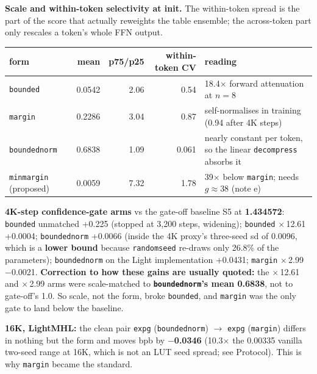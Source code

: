 \documentclass[10pt]{article}
\newcommand{\code}[1]{{\renewcommand{\_}{\textunderscore\allowbreak}\texttt{#1}}}
\begin{document}
\textbf{Scale and within-token selectivity at init.} The within-token spread is the part of the score that actually reweights the table ensemble;
the across-token part only rescales a token's whole FFN output.
\begin{center}\small
\begin{tabular}{lrrrl}
\toprule
form & mean & p75/p25 & within-token CV & reading \\
\midrule
\code{bounded} & 0.0542 & 2.06 & 0.54 & 18.4$\times$ forward attenuation at $n=8$ \\
\code{margin} & 0.2286 & 3.04 & 0.87 & self-normalises in training (0.94 after 4K steps) \\
\code{bounded\_norm} & 0.6838 & 1.09 & 0.061 & nearly constant per token, so the linear \code{decompress} absorbs it \\
\code{min\_margin} (proposed) & 0.0059 & 7.32 & 1.78 & 39$\times$ below \code{margin}; needs $g\approx38$ (note e) \\
\bottomrule
\end{tabular}
\end{center}

\textbf{4K-step confidence-gate arms} vs the gate-off baseline S5 at \textbf{1.434572}:
\code{bounded} unmatched +0.225 (stopped at 3,200 steps, widening); \code{bounded} $\times$\,12.61 +0.0004; \code{bounded\_norm} +0.0066 (inside the 4K proxy's three-seed sd of 0.0096,
which is a \textbf{lower bound} because \code{random\_seed} re-draws only 26.8\% of the parameters);
\code{bounded\_norm} on the Light implementation +0.0431; \code{margin} $\times$\,2.99 $-$0.0021.
\textbf{Correction to how these gains are usually quoted:} the $\times$\,12.61 and $\times$\,2.99 arms were scale-matched to \textbf{\code{bounded\_norm}'s mean 0.6838}, not to gate-off's 1.0.
So scale, not the form, broke \code{bounded}, and \code{margin} was the only gate to land below the baseline.

\textbf{16K, LightMHL:} the clean pair \code{exp\_g\_0189} (\code{bounded\_norm}) $\to$ \code{exp\_g\_0193} (\code{margin}) differs in nothing but the form and moves bpb by
\textbf{$-$0.0346} (10.3$\times$ the 0.00335 vanilla two-seed range at 16K, which is not an LUT seed spread; see Protocol). This is why \code{margin} became the standard.
\end{document}
